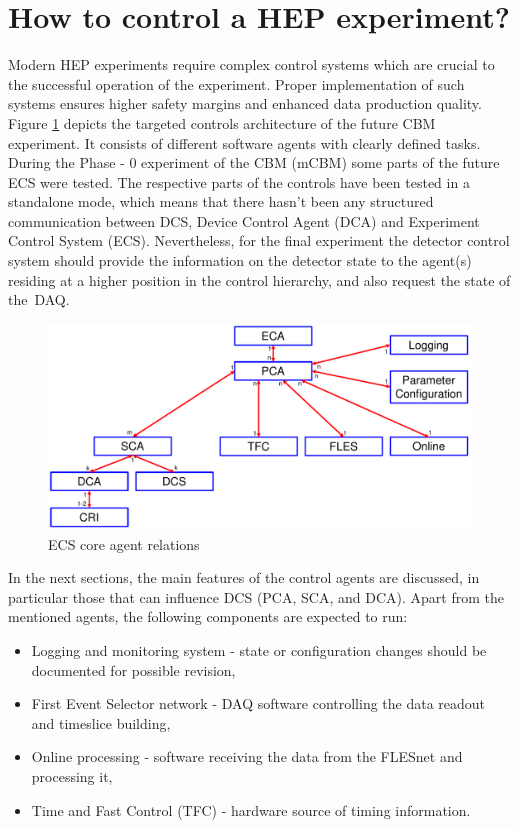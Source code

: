 \section{How to control a HEP experiment?}

Modern \gls{HEP} experiments require complex control systems which are crucial to the successful operation of the experiment. Proper implementation of such systems ensures higher safety margins and enhanced data production quality. 
Figure \ref{fig_sim} depicts the targeted controls architecture of the future \gls{CBM} experiment. It consists of different software agents with clearly defined tasks. During the Phase - 0 experiment of the \gls{CBM} (\gls{mCBM}) some parts of the future \gls{ECS} were tested. The respective parts of the controls have been tested in a standalone mode, which means that there hasn't been any structured communication between \gls{DCS}, Device Control Agent (\gls{DCA}) and Experiment Control System (\gls{ECS}). Nevertheless, for the final experiment the detector control system should provide the information on the detector state to the agent(s) residing at a higher position in the control hierarchy, and also request the state of the~\gls{DAQ}.
\begin{figure}[!h]
\centering
\includegraphics[width=0.8\columnwidth]{Chapter3/Controls/images/AgentsRelations_V2.pdf}
\caption{\gls{ECS} core agent relations}
\label{fig_sim}
\end{figure}

 In the next sections, the main features of the control agents are discussed, in particular those that can influence \gls{DCS} (\gls{PCA}, \gls{SCA}, and \gls{DCA}). Apart from the mentioned agents, the following components are expected to run: 
 \begin{itemize}
     \item Logging and monitoring system - state or configuration changes should be documented for possible revision,
     \item First Event Selector network - \gls{DAQ} software controlling the data readout and timeslice building,
     \item Online processing - software receiving the data from the FLESnet and processing it,
     \item Time and Fast Control (\gls{TFC}) - hardware source of timing information.
 \end{itemize}
